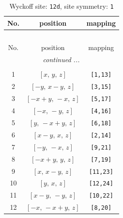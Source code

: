 \documentclass[fleqn,8pt]{jsarticle}
\begin{document}
\begin{longtable}{ccc}
\caption{Wyckoff site: {\tt 12d}, site symmetry: {\tt 1}}
 \\
 \hline \hline
No. & position & mapping \\ \hline \endfirsthead

\multicolumn{2}{l}{\tablename\ \thetable{}} \\
 \hline \hline
No. & position & mapping \\ \hline \endhead

 \hline \hline
\multicolumn{2}{r}{\footnotesize\it continued ...} \\ \endfoot

 \hline \hline
\multicolumn{2}{r}{} \\ \endlastfoot

1 & $\left[ x,\, y,\, z \right]$ & {\tt [1,13]} \\ \hline
2 & $\left[ - y,\, x - y,\, z \right]$ & {\tt [3,15]} \\ \hline
3 & $\left[ - x + y,\, - x,\, z \right]$ & {\tt [5,17]} \\ \hline
4 & $\left[ - x,\, - y,\, z \right]$ & {\tt [4,16]} \\ \hline
5 & $\left[ y,\, - x + y,\, z \right]$ & {\tt [6,18]} \\ \hline
6 & $\left[ x - y,\, x,\, z \right]$ & {\tt [2,14]} \\ \hline
7 & $\left[ - y,\, - x,\, z \right]$ & {\tt [9,21]} \\ \hline
8 & $\left[ - x + y,\, y,\, z \right]$ & {\tt [7,19]} \\ \hline
9 & $\left[ x,\, x - y,\, z \right]$ & {\tt [11,23]} \\ \hline
10 & $\left[ y,\, x,\, z \right]$ & {\tt [12,24]} \\ \hline
11 & $\left[ x - y,\, - y,\, z \right]$ & {\tt [10,22]} \\ \hline
12 & $\left[ - x,\, - x + y,\, z \right]$ & {\tt [8,20]} \\
\end{longtable}
\end{document}
